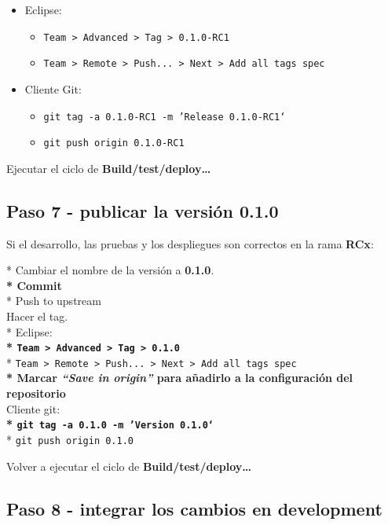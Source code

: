 \begin{itemize}
\item
  Eclipse:
  \begin{itemize}
  \item
    \texttt{Team \textgreater{} Advanced \textgreater{} Tag \textgreater{} 0.1.0-RC1}
  \item
    \texttt{Team \textgreater{} Remote \textgreater{} Push... \textgreater{} Next \textgreater{} Add all tags spec}
  \end{itemize}
\item
  Cliente Git:
  \begin{itemize}
  \item
    \texttt{git tag -a 0.1.0-RC1 -m 'Release 0.1.0-RC1`}
  \item
    \texttt{git push origin 0.1.0-RC1}
  \end{itemize}
\end{itemize}
Ejecutar el ciclo de \textbf{Build/test/deploy\ldots{}}

\subsection{Paso 7 - publicar la versión 0.1.0}

Si el desarrollo, las pruebas y los despliegues son correctos en la rama
\textbf{RCx}:

* Cambiar el nombre de la versión a \textbf{0.1.0}.\\\textbf{*
Commit\\}* Push to upstream\\Hacer el tag.\\* Eclipse:\\\textbf{*
\texttt{Team \textgreater{} Advanced \textgreater{} Tag \textgreater{} 0.1.0}\\}*
\texttt{Team \textgreater{} Remote \textgreater{} Push... \textgreater{} Next \textgreater{} Add all tags spec}\\\textbf{*
Marcar \emph{``Save in origin''} para añadirlo a la configuración del
repositorio\\} Cliente git:\\\textbf{*
\texttt{git tag -a 0.1.0 -m 'Version 0.1.0`}\\}*
\texttt{git push origin 0.1.0}

Volver a ejecutar el ciclo de \textbf{Build/test/deploy\ldots{}}

\subsection{Paso 8 - integrar los cambios en development}

